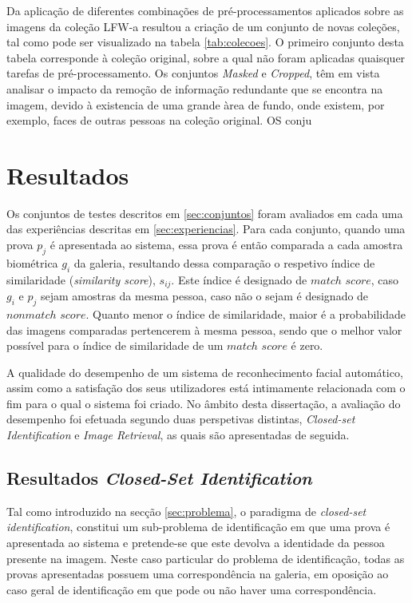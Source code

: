 Da aplicação de diferentes combinações de pré-processamentos aplicados sobre as imagens da coleção LFW-a resultou a criação de um conjunto de novas coleções,  tal como pode ser visualizado na tabela \ref{tab:colecoes}. O primeiro conjunto desta tabela corresponde à coleção original, sobre a qual não foram aplicadas quaisquer tarefas de pré-processamento. Os conjuntos \textit{Masked} e \textit{Cropped}, têm em vista analisar o impacto da remoção de informação redundante que se encontra na imagem, devido à existencia de uma grande àrea de fundo, onde existem, por exemplo, faces de outras pessoas na coleção original. OS conju


\section{Resultados}
Os conjuntos de testes descritos em \ref{sec:conjuntos} foram avaliados em cada uma das experiências descritas em \ref{sec:experiencias}. Para cada conjunto, quando uma prova $p_j$ é apresentada ao sistema, essa prova é então comparada a cada amostra biométrica $g_i$ da galeria, resultando dessa comparação o respetivo índice de similaridade (\textit{similarity score}), $s_{ij}$. Este índice é designado de $match$ $score$, caso $g_i$ e $p_j$ sejam amostras da mesma pessoa, caso não o sejam é designado de $nonmatch$ $score$. Quanto menor o índice de similaridade, maior é a probabilidade das imagens comparadas pertencerem à mesma pessoa, sendo que o melhor valor possível para o índice de similaridade de um $match$ $score$ é zero.

A qualidade do desempenho de um sistema de reconhecimento facial automático, assim como a satisfação dos seus utilizadores está intimamente relacionada com o fim para o qual o sistema foi criado. No âmbito desta dissertação, a avaliação do desempenho foi efetuada segundo duas perspetivas distintas, \textit{Closed-set Identification} e \textit{Image Retrieval}, as quais são apresentadas de seguida.

\subsection{Resultados \textit{Closed-Set Identification}} \label{sec:avaliacao1}
Tal como introduzido na secção \ref{sec:problema}, o paradigma de \textit{closed-set identification}, constitui um sub-problema de identificação em que uma prova é apresentada ao sistema e pretende-se que este devolva a identidade da pessoa presente na imagem. Neste caso particular do problema de identificação, todas as provas apresentadas possuem uma correspondência na galeria, em oposição ao caso geral de identificação em que pode ou não haver uma correspondência.

